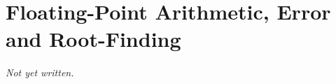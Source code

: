 \chapter{Floating-Point Arithmetic, Error and Root-Finding}\label{ch:floating-point-root-finding}


\textit{Not yet written.}
